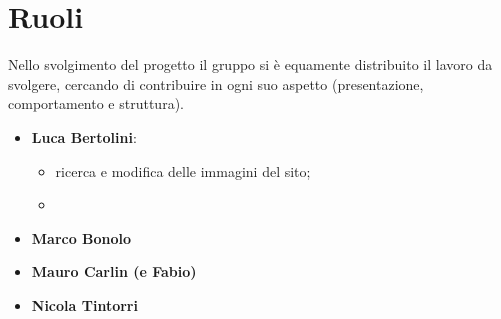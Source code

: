 \section{Ruoli}
Nello svolgimento del progetto il gruppo si è equamente distribuito il lavoro da svolgere, cercando di contribuire in ogni suo aspetto (presentazione, comportamento e struttura).
\begin{itemize}
	\item \textbf{Luca Bertolini}:
	\begin{itemize}
		\item ricerca e modifica delle immagini del sito;
		\item 
	\end{itemize}
	\item \textbf{Marco Bonolo}
	
	\item \textbf{Mauro Carlin (e Fabio)}
	\item \textbf{Nicola Tintorri}
\end{itemize}